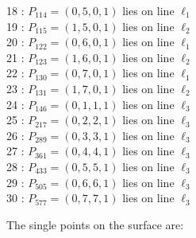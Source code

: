 \documentclass{article}
\begin{document}
{\begin{multicols}{2}
18 : $P_{114}=( 0, 5, 0, 1 )$ lies on line $\ell_{1}$\\
19 : $P_{115}=( 1, 5, 0, 1 )$ lies on line $\ell_{2}$\\
20 : $P_{122}=( 0, 6, 0, 1 )$ lies on line $\ell_{1}$\\
21 : $P_{123}=( 1, 6, 0, 1 )$ lies on line $\ell_{2}$\\
22 : $P_{130}=( 0, 7, 0, 1 )$ lies on line $\ell_{1}$\\
23 : $P_{131}=( 1, 7, 0, 1 )$ lies on line $\ell_{2}$\\
24 : $P_{146}=( 0, 1, 1, 1 )$ lies on line $\ell_{3}$\\
25 : $P_{217}=( 0, 2, 2, 1 )$ lies on line $\ell_{3}$\\
26 : $P_{289}=( 0, 3, 3, 1 )$ lies on line $\ell_{3}$\\
27 : $P_{361}=( 0, 4, 4, 1 )$ lies on line $\ell_{3}$\\
28 : $P_{433}=( 0, 5, 5, 1 )$ lies on line $\ell_{3}$\\
29 : $P_{505}=( 0, 6, 6, 1 )$ lies on line $\ell_{3}$\\
30 : $P_{577}=( 0, 7, 7, 1 )$ lies on line $\ell_{3}$\\
\end{multicols}
The single points on the surface are:\\
}
\end{document}
